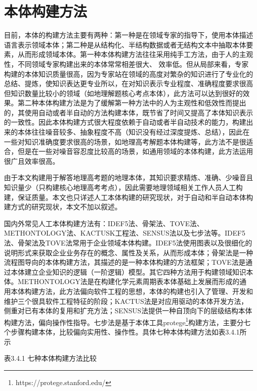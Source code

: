 \section{本体构建方法}
目前，本体的构建方法\cite{yue}主要有两种：第一种是在领域专家的指导下，使用本体描述语言表示领域本体；第二种是从结构化、半结构数据或者无结构文本中抽取本体要素，从而形成领域本体。第一种本体构建方法往往采用纯手工方法，由于人的主观性，不同领域专家构建出来的本体常常相差很大、
效率低。但从局部来看，专家构建的本体知识质量很高，因为专家站在领域的高度对繁杂的知识进行了专业化的总结、提炼，使知识表达更专业所以，在对知识表示专业程度、准确程度要求很高但知识数量比较小的领域（如地理解题核心考点本体），此方法可以达到很好的效果。第二种本体构建方法是为了缓解第一种方法中的人为主观性和低效性而提出的，其使用自动或者半自动的方法构建本体，既节省了时间又提高了本体知识表示的一致性。因此本体构建方式很大程度依赖于自动或者半自动技术的能力，构建出来的本体往往噪音较多、抽象程度不高（知识没有经过深度提炼、总结），因此在一些对知识准确度要求很高的场景，如地理高考解题本体构建等，此方法不是很适合，但是在一些对噪音容忍度比较高的场景，如通用领域的本体构建，此方法运用很广且效率很高。

由于本文构建用于解答地理高考题的地理本体，其知识要求精炼、准确、少噪音且知识量少（只构建核心地理高考考点），因此需要地理领域相关工作人员人工构建，保证质量。本文也只详述人工本体构建的研究现状，对于自动和半自动本体构建方式的研究现状，本文不加以叙述。

国内外常见人工本体构建方法有：IDEF5法\cite{IDEF5}、骨架法\cite{skelton}、TOVE法\cite{TOVE}、METHONTOLOGY法\cite{METHONTOLOGY}、KACTUSK工程法\cite{KACTUSK,KACTUSK2}、SENSUS法\cite{SENSUS}以及七步法\cite{seven}等。IDEF5法、骨架法及TOVE法常用于企业领域本体构建。IDEF5法使用图表以及很细化的说明形式来获取企业业务存在的概念、属性及关系，从而形成本体；骨架法是一种流程图导向的本体构建方法，其描述的是一种本体构建的方法框架；TOVE法是通过本体建立企业知识的逻辑（一阶逻辑）模型。其它四种方法用于构建领域知识本体。METHONTOLOGY法是在构建化学元素周期表本体基础上发展而形成的通用本体构建方法，此方法偏向软件工程的思想，本体的构建也引入了管理、开发和维护三个很具软件工程特征的阶段；KACTUS法是对应用驱动的本体开发方法，侧重对已有本体的复用和扩充方法；SENSUS法提供一种自顶向下的层级结构本体构建方法，偏向操作性指导。七步法是基于本体工具protege\footnote{https://protege.stanford.edu/}构建方法，主要分七个步骤构建本体，比较偏向实用性、操作性。具体七种本体构建方法如表3.4.1所示

\begin{center}
	表3.4.1 七种本体构建方法比较
\end{center}

